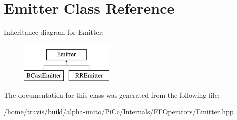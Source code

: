 \hypertarget{class_emitter}{\section{\-Emitter \-Class \-Reference}
\label{class_emitter}
}
\-Inheritance diagram for \-Emitter\-:\begin{figure}[H]
\begin{center}
\leavevmode
\includegraphics[height=2.000000cm]{class_emitter}
\end{center}
\end{figure}


\-The documentation for this class was generated from the following file\-:\begin{DoxyCompactItemize}
\item 
/home/travis/build/alpha-\/unito/\-Pi\-Co/\-Internals/\-F\-F\-Operators/\-Emitter.\-hpp\end{DoxyCompactItemize}
